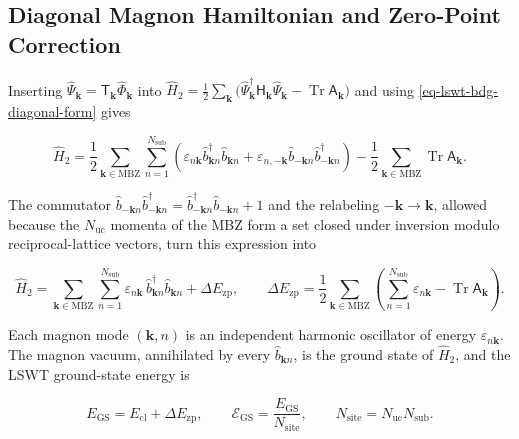 \subsection{Diagonal Magnon Hamiltonian and Zero-Point Correction}

Inserting \(\hat\Psi_{\mathbf k}=\mathsf T_{\mathbf k}\hat\Phi_{\mathbf k}\) into \(\hat H_2=\frac12\sum_{\mathbf k}\big(\hat\Psi_{\mathbf k}^\dagger\mathsf H_{\mathbf k}\hat\Psi_{\mathbf k}-\operatorname{Tr}\mathsf A_{\mathbf k}\big)\) and using \eqref{eq-lswt-bdg-diagonal-form} gives

\[
\hat H_2
=\frac12\sum_{\mathbf k\in\mathrm{MBZ}}\sum_{n=1}^{N_{\mathrm{sub}}}
\left(\varepsilon_{n\mathbf k}\hat b_{\mathbf kn}^\dagger\hat b_{\mathbf kn}
+\varepsilon_{n,-\mathbf k}\hat b_{-\mathbf kn}\hat b_{-\mathbf kn}^\dagger\right)
-\frac12\sum_{\mathbf k\in\mathrm{MBZ}}\operatorname{Tr}\mathsf A_{\mathbf k}.
\]

The commutator \(\hat b_{-\mathbf kn}\hat b_{-\mathbf kn}^\dagger=\hat b_{-\mathbf kn}^\dagger\hat b_{-\mathbf kn}+1\) and the relabeling \(-\mathbf k\to\mathbf k\), allowed because the \(N_{\mathrm{uc}}\) momenta of the MBZ form a set closed under inversion modulo reciprocal-lattice vectors, turn this expression into

\begin{equation}\label{eq-lswt-diagonal-magnon-hamiltonian}
\hat H_2
=\sum_{\mathbf k\in\mathrm{MBZ}}\sum_{n=1}^{N_{\mathrm{sub}}}\varepsilon_{n\mathbf k}\,\hat b_{\mathbf kn}^\dagger\hat b_{\mathbf kn}
+\Delta E_{\mathrm{zp}},
\qquad
\Delta E_{\mathrm{zp}}
=\frac12\sum_{\mathbf k\in\mathrm{MBZ}}\left(\sum_{n=1}^{N_{\mathrm{sub}}}\varepsilon_{n\mathbf k}-\operatorname{Tr}\mathsf A_{\mathbf k}\right).
\end{equation}

Each magnon mode \((\mathbf k,n)\) is an independent harmonic oscillator of energy \(\varepsilon_{n\mathbf k}\). The magnon vacuum, annihilated by every \(\hat b_{\mathbf kn}\), is the ground state of \(\hat H_2\), and the LSWT ground-state energy is

\begin{equation}\label{eq-lswt-zero-point-correction}
E_{\mathrm{GS}}=E_{\mathrm{cl}}+\Delta E_{\mathrm{zp}},
\qquad
\mathcal E_{\mathrm{GS}}=\frac{E_{\mathrm{GS}}}{N_{\mathrm{site}}},
\qquad
N_{\mathrm{site}}=N_{\mathrm{uc}}N_{\mathrm{sub}}.
\end{equation}

